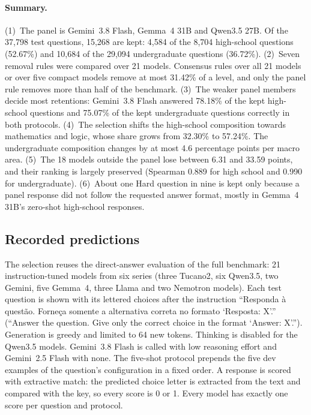 \paragraph{Summary.} (1)~The panel is Gemini~3.8 Flash, Gemma~4 31B and
Qwen3.5 27B. Of the 37,798 test questions, 15,268 are kept: 4,584 of the
8,704 high-school questions (52.67\%) and 10,684 of the 29,094 undergraduate
questions (36.72\%). (2)~Seven removal rules were compared over 21 models.
Consensus rules over all 21 models or over five compact models remove at
most 31.42\% of a level, and only the panel rule removes more than half of
the benchmark. (3)~The weaker panel members decide most retentions:
Gemini~3.8 Flash answered 78.18\% of the kept high-school questions and
75.07\% of the kept undergraduate questions correctly in both protocols.
(4)~The selection shifts the high-school composition towards mathematics and
logic, whose share grows from 32.30\% to 57.24\%. The undergraduate
composition changes by at most 4.6 percentage points per macro area.
(5)~The 18 models outside the panel lose between 6.31 and 33.59 points, and
their ranking is largely preserved (Spearman 0.889 for high school and 0.990
for undergraduate). (6)~About one Hard question in nine is kept only because
a panel response did not follow the requested answer format, mostly in
Gemma~4 31B's zero-shot high-school responses.

\subsection{Recorded predictions}
\label{app:hard-predictions}

The selection reuses the direct-answer evaluation of the full benchmark: 21
instruction-tuned models from six series (three Tucano2, six Qwen3.5, two
Gemini, five Gemma~4, three Llama and two Nemotron models). Each test
question is shown with its lettered choices after the instruction
``Responda à questão. Forneça somente a alternativa correta no formato
`Resposta: X'.'' (``Answer the question. Give only the correct choice in
the format `Answer: X'.''). Generation is greedy and limited to 64 new
tokens. Thinking is disabled for the Qwen3.5 models. Gemini~3.8 Flash is
called with low reasoning effort and Gemini~2.5 Flash with none. The five-shot protocol prepends the five dev
examples of the question's configuration in a fixed order. A response is
scored with extractive match: the predicted choice letter is extracted from
the text and compared with the key, so every score is 0 or 1. Every model has
exactly one score per question and protocol.

